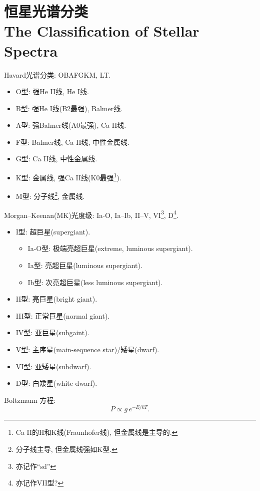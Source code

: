 \chapter{恒星光谱分类\\The Classification of Stellar Spectra}

Havard光谱分类: OBAFGKM, LT.
\begin{itemize}
    \item O型: 强He II线, He I线.
    \item B型: 强He I线(B2最强), Balmer线.
    \item A型: 强Balmer线(A0最强), Ca II线.
    \item F型: Balmer线, Ca II线, 中性金属线.
    \item G型: Ca II线, 中性金属线.
    \item K型: 金属线, 强Ca II线(K0最强\footnote{Ca II的H和K线(Fraunhofer线), 但金属线是主导的.}).
    \item M型: 分子线\footnote{分子线主导, 但金属线强如K型.}, 金属线.
\end{itemize}

Morgan--Keenan(MK)光度级: Ia-O, Ia--Ib, II--V, VI\footnote{亦记作``sd''}, D\footnote{亦记作VII型?}.
\begin{itemize}
    \item I型: 超巨星(supergiant).
    \begin{itemize}
        \item Ia-O型: 极端亮超巨星(extreme, luminous supergiant).
        \item Ia型: 亮超巨星(luminous supergiant).
        \item Ib型: 次亮超巨星(less luminous supergiant).
    \end{itemize}
    \item II型: 亮巨星(bright giant).
    \item III型: 正常巨星(normal giant).
    \item IV型: 亚巨星(subgaint).
    \item V型: 主序星(main-sequence star)/矮星(dwarf).
    \item VI型: 亚矮星(subdwarf).
    \item D型: 白矮星(white dwarf).
\end{itemize}

Boltzmann 方程:
\begin{equation*}
    P \propto g\,e^{-E/kT}.
\end{equation*}

